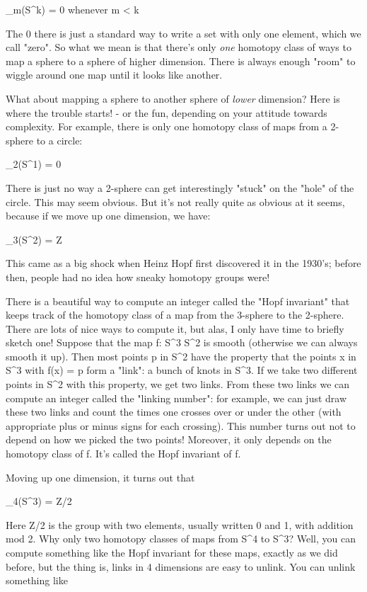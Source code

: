 \pi _{m}(S^{k}) = {0}                whenever m < k

The {0} there is just a standard way to write a set with only one
element, which we call "zero".  So what we mean is that there's only
\emph{one} homotopy class of ways to map a sphere to a sphere of higher
dimension.  There is always enough "room" to wiggle around one map until
it looks like another.

What about mapping a sphere to another sphere of \emph{lower} dimension?
Here is where the trouble starts! - or the fun, depending on your
attitude towards complexity.   For example, there is only one homotopy
class of maps from a 2-sphere to a circle:

\pi _{2}(S^{1}) = {0}

There is just no way a 2-sphere can get interestingly "stuck" on the
"hole" of the circle.  This may seem obvious.  But it's not 
really quite as obvious at it seems, because if we move up one dimension, 
we have:

\pi _{3}(S^{2}) = Z

This came as a big shock when Heinz Hopf first discovered it in the
1930's; before then, people had no idea how sneaky homotopy groups were!

There is a beautiful way to compute an integer called the "Hopf 
invariant"
that keeps track of the homotopy class of a map from the 3-sphere to the
2-sphere.  There are lots of nice ways to compute it, but alas, I only
have time to briefly sketch one!  Suppose that the map f: S^{3} \to S^{2} is
smooth (otherwise we can always smooth it up).  Then most points p in
S^{2} have the property that the points x in S^{3} with f(x) = p form a
"link": a bunch of knots in S^{3}.  If we take two different points in S^{2}
with this property, we get two links.  From these two links we can
compute an integer called the "linking number":
for example, we can just
draw these two links and count the times one crosses over or under the 
other (with appropriate plus or minus signs for each crossing).  This number
turns out not to depend on how we picked the two points!  Moreover, it
only depends on the homotopy class of f.  It's called the Hopf invariant
of f.

Moving up one dimension, it turns out that

\pi _{4}(S^{3}) = Z/2

Here Z/2 is the group with two elements, usually written 0 and 1,
with addition mod 2.  Why only two homotopy classes of maps from
S^{4} to S^{3}?  Well, you can compute something like the Hopf invariant
for these maps, exactly as we did before, but the thing is, links
in 4 dimensions are easy to unlink.  You can unlink something like

